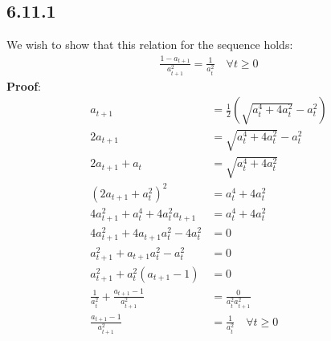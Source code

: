\documentclass[]{article}
\begin{document}
    \subsection*{6.11.1}
        We wish to show that this relation for the sequence holds: 
        \begin{align*}\tag{6.11.1.1}\label{eqn:6.11.1.1}
            \frac{1 - a_{t + 1}}{a^2_{t + 1}} = \frac{1}{a_t^2} \quad
            \forall t \ge 0 
        \end{align*}
        \textbf{Proof}: 
        \begin{align*}\tag{6.11.1.2}\label{eqn:6.11.1.2}
            a_{t + 1} &= \frac{1}{2}
            \left(\sqrt{a_t^4 + 4a_t^2} - a_t^2\right)
            \\
            2a_{t + 1} &= 
            \sqrt{a_t^4 + 4a_t^2} - a_t^2
            \\
            2a_{t + 1} + a_t &= \sqrt{a_t^4 + 4a_t^2}
            \\
            (2a_{t + 1} + a_t^2)^2 &= a_t^4 + 4a_t^2
            \\
            4a_{t + 1}^2 + a_t^4 + 4a_t^2a_{t+1} &= a_t^4 + 4a_t^2
            \\
            4a_{t + 1}^2 + 4a_{t + 1}a_t^2 - 4a_t^2 &= 0
            \\
            a_{t + 1}^2 + a_{t + 1}a_t^2 - a_t^2 &= 0
            \\
            a_{t + 1}^2 + a^2_t(a_{t + 1} - 1) &= 0
            \\
            \frac{1}{a_t^2} + \frac{a_{t + 1} - 1}{a_{t + 1}^2} &= \frac{0}{a_{t}^2a_{t + 1}^2}
            \\
            \frac{a_{t + 1} - 1}{a_{t + 1}^2} &= \frac{1}{a_t^2} \quad \forall t \ge 0
        \end{align*}
\end{document}
